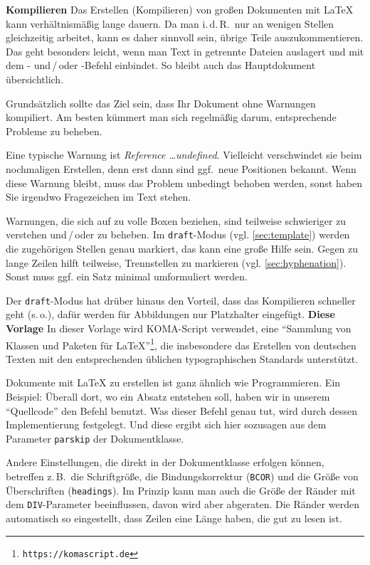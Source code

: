 %
\textbf{Kompilieren}
\label{sec:compilation}
Das Erstellen (Kompilieren) von großen Dokumenten mit \LaTeX{} kann verhältnismäßig lange dauern. Da man i.\,d.\,R.\ nur an wenigen Stellen gleichzeitig arbeitet, kann es daher sinnvoll sein, übrige Teile auszukommentieren. Das geht besonders leicht, wenn man Text in getrennte Dateien auslagert und mit dem - und\,/\,oder -Befehl einbindet. So bleibt auch das Hauptdokument übersichtlich.
\par
Grundsätzlich sollte das Ziel sein, dass Ihr Dokument ohne Warnungen kompiliert. Am besten kümmert man sich regelmäßig darum, entsprechende Probleme zu beheben.
\par
Eine typische Warnung ist \glqq \emph{Reference \ldots undefined}\grqq{}. Vielleicht verschwindet sie beim nochmaligen Erstellen, denn erst dann sind ggf.\ neue Positionen bekannt. Wenn diese Warnung bleibt, muss das Problem unbedingt behoben werden, sonst haben Sie irgendwo Fragezeichen im Text stehen.
\par
Warnungen, die sich auf zu volle Boxen beziehen, sind teilweise schwieriger zu verstehen und\,/\,oder zu beheben. Im \texttt{draft}-Modus (vgl. \cref{sec:template}) werden die zugehörigen Stellen genau markiert, das kann eine große Hilfe sein. Gegen zu lange Zeilen hilft teilweise, Trennstellen zu markieren (vgl. \cref{sec:hyphenation}). Sonst muss ggf. ein Satz minimal umformuliert werden.
\par
Der \texttt{draft}-Modus hat drüber hinaus den Vorteil, dass das Kompilieren schneller geht (s.\,o.), dafür werden für Abbildungen nur Platzhalter eingefügt.
%
%
\textbf{Diese Vorlage}
\label{sec:template}
In dieser Vorlage wird KOMA-Script verwendet, eine \enquote{Sammlung von Klassen und Paketen für \LaTeX{}}\footnote{\texttt{https://komascript.de}}, die insbesondere das Erstellen von deutschen Texten mit den entsprechenden üblichen typographischen Standards unterstützt.
\par
Dokumente mit \LaTeX{} zu erstellen ist ganz ähnlich wie Programmieren. Ein Beispiel: Überall dort, wo ein Absatz entstehen soll, haben wir in unserem \enquote{Quellcode} den Befehl  benutzt. Was dieser Befehl genau tut, wird durch dessen Implementierung festgelegt. Und diese ergibt sich hier sozusagen aus dem Parameter \texttt{parskip} der Dokumentklasse.
\par
Andere Einstellungen, die direkt in der Dokumentklasse erfolgen können, betreffen z.\,B.\ die Schriftgröße, die Bindungskorrektur (\texttt{BCOR}) und die Größe von Überschriften (\texttt{headings}). Im Prinzip kann man auch die Größe der Ränder mit dem \texttt{DIV}-Parameter beeinflussen, davon wird aber abgeraten. Die Ränder werden automatisch so eingestellt, dass Zeilen eine Länge haben, die gut zu lesen ist.
